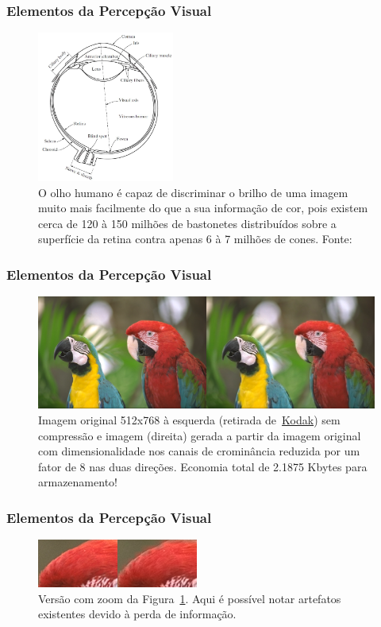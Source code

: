 \documentclass{beamer}
\begin{document}
\begin{frame}
\frametitle{Elementos da Percepção Visual}
\begin{figure}
\includegraphics[width=0.4\textwidth]{figs/human_eye.pdf}
\caption{O olho humano é capaz de discriminar o brilho de uma imagem muito mais facilmente do que a sua informação de cor, pois existem cerca de 120 à 150 milhões de bastonetes distribuídos sobre a superfície da retina contra apenas 6 à 7 milhões de cones. Fonte:~\cite{ipi}}
\end{figure}
\end{frame}
\begin{frame}
\frametitle{Elementos da Percepção Visual}
\begin{figure}
\includegraphics[width=\textwidth]{figs/image_comparison.png}
\caption{Imagem original 512x768 à esquerda (retirada de~\href{http://r0k.us/graphics/kodak/}{Kodak}) sem compressão e imagem (direita) gerada a partir da imagem original com dimensionalidade nos canais de crominância reduzida por um fator de 8 nas duas direções. Economia total de 2.1875 Kbytes para armazenamento!}
\label{fig:image_comp}
\end{figure}
\end{frame}
\begin{frame}
\frametitle{Elementos da Percepção Visual}
\begin{figure}
\includegraphics[width=\textwidth]{figs/zoom_image.png}
\caption{Versão com zoom da Figura~\ref{fig:image_comp}. Aqui é possível notar artefatos existentes devido à perda de informação.}
\end{figure}
\end{frame}
\end{document}
